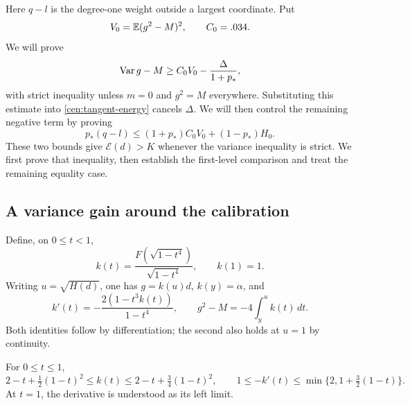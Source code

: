 Here $q-l$ is the degree-one weight outside a largest coordinate.
Put
\begin{equation}\label{cen:V0}
 V_0=\mathbb E(g^2-M)^2,\qquad C_0=.034.
\end{equation}
We will prove
\begin{equation}\label{cen:variance-gain}
 \operatorname{Var} g-M\ge C_0V_0-\frac\Delta{1+p_*},
\end{equation}
with strict inequality unless $m=0$ and $g^2=M$ everywhere.
Substituting this estimate into \eqref{cen:tangent-energy} cancels
$\Delta$.  We will then control the remaining negative term by proving
\[
 p_*(q-l)\le(1+p_*)C_0V_0+(1-p_*)H_0.
\]
These two bounds give $\mathcal E(d)>K$ whenever the variance inequality
is strict.  We first prove that inequality, then establish the
first-level comparison and treat the remaining equality case.

\subsection{A variance gain around the calibration}

Define, on $0\le t<1$,
\[
 k(t)=\frac{F(\sqrt{1-t^4})}{\sqrt{1-t^4}},\qquad k(1)=1.
\]
Writing $u=\sqrt{H(d)}$, one has $g=k(u)d$, $k(y)=\alpha$, and
\begin{equation}\label{cen:k-ode}
 k'(t)=-\frac{2(1-t^3k(t))}{1-t^4},\qquad
 g^2-M=-4\int_y^u k(t)\,dt.
\end{equation}
Both identities follow by differentiation; the second also holds at
$u=1$ by continuity.

\begin{lemma}\label{cen:k-bounds}
For $0\le t\le1$,
\begin{equation}\label{cen:k-estimates}
 2-t+\tfrac12(1-t)^2\le k(t)\le2-t+\tfrac34(1-t)^2,
 \qquad
 1\le-k'(t)\le\min\{2,1+\tfrac32(1-t)\}.
\end{equation}
At $t=1$, the derivative is understood as its left limit.
\end{lemma}

